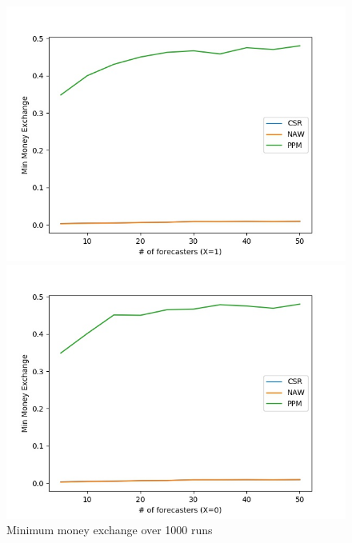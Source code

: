 \documentclass[english,10pt]{article}
\begin{document}
\begin{enumerate}
        	\begin{figure}[H]
        	\centering
        	\begin{minipage}{0.48\textwidth}
        	\includegraphics[width = \textwidth]{(Beta_100_100)Min_MnEx(X=1).jpg}
        	\end{minipage}
        	\begin{minipage}{0.48\textwidth}
        	\includegraphics[width = \textwidth]{(Beta_100_100)Min_MnEx(X=0).jpg}
        	\end{minipage}
        	\caption{Minimum money exchange over 1000 runs}
        	\end{figure}
	\end{enumerate}
\end{document}
